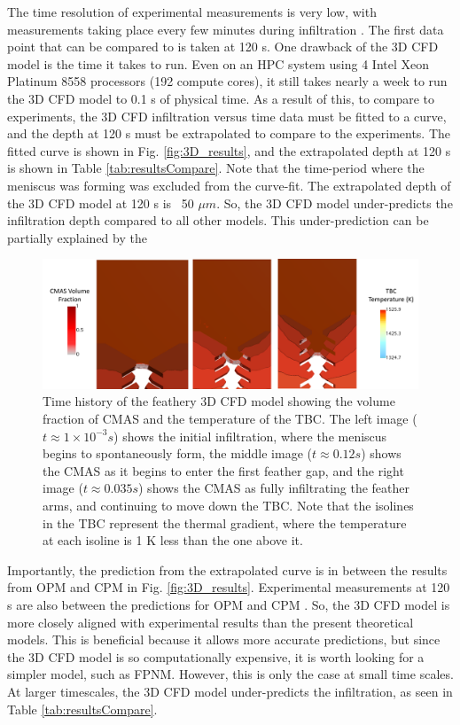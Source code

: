 \documentclass{UCF_ETD}
\begin{document}
The time resolution of experimental measurements is very low, with measurements taking place every few minutes during infiltration \cite{Naraparaju2017}. The first data point that can be compared to is taken at 120 s. One drawback of the 3D CFD model is the time it takes to run. Even on an HPC system using 4 Intel Xeon Platinum 8558 processors (192 compute cores), it still takes nearly a week to run the 3D CFD model to 0.1 s of physical time. As a result of this, to compare to experiments, the 3D CFD infiltration versus time data must be fitted to a curve, and the depth at 120 s must be extrapolated to compare to the experiments. The fitted curve is shown in Fig. \ref{fig:3D_results}, and the extrapolated depth at 120 s is shown in Table \ref{tab:resultsCompare}. Note that the time-period where the meniscus was forming was excluded from the curve-fit. The extrapolated depth of the 3D CFD model at 120 s is ~50 $\mu m$. So, the 3D CFD model under-predicts the infiltration depth compared to all other models. This under-prediction can be partially explained by the 

\begin{figure}
    \centering
    \includegraphics[width=\linewidth]{Figures/3D_timehistory.png}
    \caption{Time history of the feathery 3D CFD model showing the volume fraction of CMAS and the temperature of the TBC. The left image ($t \approx 1\times 10^{-3}s$) shows the initial infiltration, where the meniscus begins to spontaneously form, the middle image ($t \approx 0.12 s$) shows the CMAS as it begins to enter the first feather gap, and the right image ($t \approx 0.035 s$) shows the CMAS as fully infiltrating the feather arms, and continuing to move down the TBC. Note that the isolines in the TBC represent the thermal gradient, where the temperature at each isoline is 1 K less than the one above it.}
    \label{fig:3D_timehistory}
\end{figure}

Importantly, the prediction from the extrapolated curve is in between the results from OPM and CPM in Fig. \ref{fig:3D_results}. Experimental measurements at 120 s are also between the predictions for OPM and CPM \cite{Naraparaju2017}. So, the 3D CFD model is more closely aligned with experimental results than the present theoretical models. This is beneficial because it allows more accurate predictions, but since the 3D CFD model is so computationally expensive, it is worth looking for a simpler model, such as FPNM. However, this is only the case at small time scales. At larger timescales, the 3D CFD model under-predicts the infiltration, as seen in Table \ref{tab:resultsCompare}. 
\end{document}
